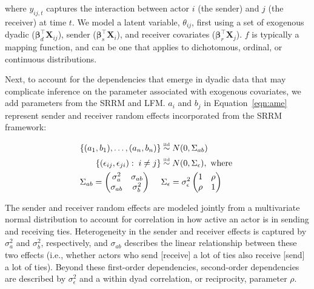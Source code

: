 where $y_{ij,t}$ captures the interaction between actor $i$ (the sender) and $j$ (the receiver) at time $t$. We model a latent variable, $\theta_{ij}$, first using a set of exogenous dyadic ($\bm\beta_{d}^{\top} \mathbf{X}_{ij}$), sender ($\bm\beta_{s}^{\top} \mathbf{X}_{i}$), and receiver covariates ($\bm\beta_{r}^{\top} \mathbf{X}_{j}$). $f$ is typically a mapping function, and can be one that applies to dichotomous, ordinal, or continuous distributions.

Next, to account for the dependencies that emerge in dyadic data that may complicate inference on the parameter associated with exogenous covariates, we add parameters from the SRRM and LFM. $a_{i}$ and $b_{j}$ in Equation~\ref{eqn:ame} represent sender and receiver random effects incorporated from the SRRM framework:

\begin{align}
	\begin{aligned}
		\{ (a_{1}, b_{1}), \ldots, (a_{n}, b_{n}) \} &\simiid N(0,\Sigma_{ab}) \\ 
		\{ (\epsilon_{ij}, \epsilon_{ji}) : \; i \neq j\} &\simiid N(0,\Sigma_{\epsilon}), \text{ where } \\
		\Sigma_{ab} = \begin{pmatrix} \sigma_{a}^{2} & \sigma_{ab} \\ \sigma_{ab} & \sigma_{b}^2   \end{pmatrix} \;\;\;\;\; &\Sigma_{\epsilon} = \sigma_{\epsilon}^{2} \begin{pmatrix} 1 & \rho \\ \rho & 1  \end{pmatrix}
	\label{eqn:srm}
	\end{aligned}
\end{align}

The sender and receiver random effects are modeled jointly from a multivariate normal distribution to account for correlation in how active an actor is in sending and receiving ties. Heterogeneity in the sender and receiver effects is captured by $\sigma_{a}^{2}$ and $\sigma_{b}^{2}$, respectively, and $\sigma_{ab}$ describes the linear relationship between these two effects (i.e., whether actors who send [receive] a lot of ties also receive [send] a lot of ties). Beyond these first-order dependencies, second-order dependencies are described by $\sigma_{\epsilon}^{2}$ and a within dyad correlation, or reciprocity, parameter $\rho$. 

